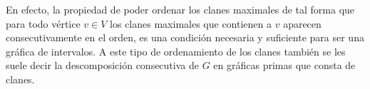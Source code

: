 En efecto, la propiedad de poder ordenar los clanes maximales de tal forma que
para todo vértice $v\in V$ los clanes maximales que contienen a $v$ aparecen
consecutivamente en el orden, es una condición necesaria y suficiente para ser
una gráfica de intervalos. A este tipo de ordenamiento de los clanes tambi\'en se les suele decir la descomposici\'on consecutiva de $G$ en gr\'aficas primas que consta de clanes. 

